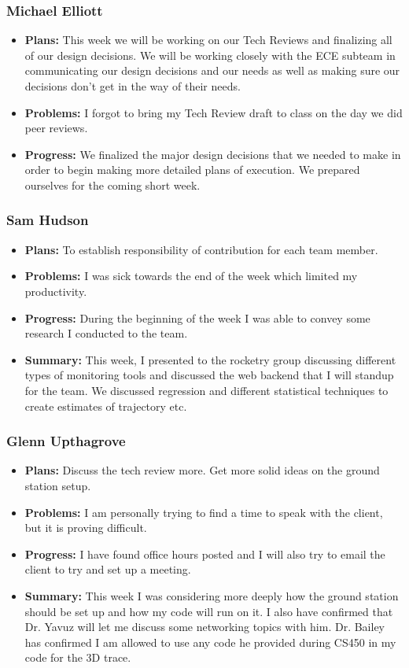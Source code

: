 \documentclass[onecolumn, draftclsnofoot,10pt, compsoc]{IEEEtran}
\begin{document}
\subsubsection{Michael Elliott}
\begin {itemize}
\item \textbf{Plans: }
  This week we will be working on our Tech Reviews and finalizing all of our design decisions. We will be working closely with the ECE subteam in communicating our design decisions and our needs as well as making sure our decisions don't get in the way of their needs.
\item \textbf{Problems: }
  I forgot to bring my Tech Review draft to class on the day we did peer reviews.
\item \textbf{Progress: }
  We finalized the major design decisions that we needed to make in order to begin making more detailed plans of execution. We prepared ourselves for the coming short week.
\end {itemize}
\subsubsection{Sam Hudson}
\begin {itemize}
\item \textbf{Plans: }To establish responsibility of contribution for each team member.
\item \textbf{Problems: }I was sick towards the end of the week which limited my productivity. 
\item \textbf{Progress: }During the beginning of the week I was able to convey some research I conducted to the team.
\item \textbf{Summary: }This week, I presented to the rocketry group discussing different types of monitoring tools and discussed the web backend that I will standup for the team. We discussed regression and different statistical techniques to create estimates of trajectory etc.
\end {itemize}
\subsubsection{Glenn Upthagrove}
\begin {itemize}
 \item \textbf{Plans: }Discuss the tech review more. Get more solid ideas on the ground station setup. 
 \item \textbf{Problems: }I am personally trying to find a time to speak with the client, but it is proving difficult. 
 \item \textbf{Progress: }I have found office hours posted and I will also try to email the client to try and set up a meeting.
 \item \textbf{Summary: }This week I was considering more deeply how the ground station should be set up and how my code will run on it. I also have confirmed that Dr. Yavuz will let me discuss some networking topics with him. Dr. Bailey has confirmed I am allowed to use any code he provided during CS450 in my code for the 3D trace.  
\end {itemize}
\end{document}
